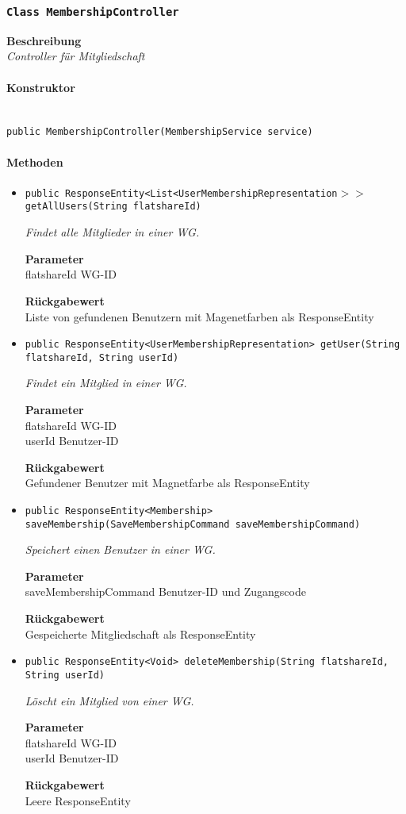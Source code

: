     \subsubsection{\texttt{Class MembershipController}}
    \textbf{Beschreibung} \\
    \textit{Controller für Mitgliedschaft}
    \paragraph*{Konstruktor}\mbox{} \\
    \texttt{public MembershipController(MembershipService service)} \\
    \paragraph*{Methoden}
    \begin{itemize}
    	\item{\texttt{public ResponseEntity<List<UserMembershipRepresentation$>>$ getAllUsers(String flatshareId)}}
    	
    	\textit{Findet alle Mitglieder in einer WG.}
    	
    	\textbf{Parameter} \\
    	flatshareId WG-ID
    	
    	\textbf{Rückgabewert} \\
    	Liste von gefundenen Benutzern mit Magenetfarben als ResponseEntity        \item{\texttt{public ResponseEntity<UserMembershipRepresentation> getUser(String flatshareId, String userId)}}
    	
    	\textit{Findet ein Mitglied in einer WG.}
    	
    	\textbf{Parameter} \\
    	flatshareId WG-ID\\
    	userId Benutzer-ID
    	
    	\textbf{Rückgabewert} \\
    	Gefundener Benutzer mit Magnetfarbe als ResponseEntity        \item{\texttt{public ResponseEntity<Membership> saveMembership(SaveMembershipCommand saveMembershipCommand)}}
    	
    	\textit{Speichert einen Benutzer in einer WG.}
    	
    	\textbf{Parameter} \\
    	saveMembershipCommand Benutzer-ID und Zugangscode
    	
    	\textbf{Rückgabewert} \\
    	Gespeicherte Mitgliedschaft als ResponseEntity        \item{\texttt{public ResponseEntity<Void> deleteMembership(String flatshareId, String userId)}}
    	
    	\textit{Löscht ein Mitglied von einer WG.}
    	
    	\textbf{Parameter} \\
    	flatshareId WG-ID\\
    	userId Benutzer-ID
    	
    	\textbf{Rückgabewert} \\
    	Leere ResponseEntity
    \end{itemize}
